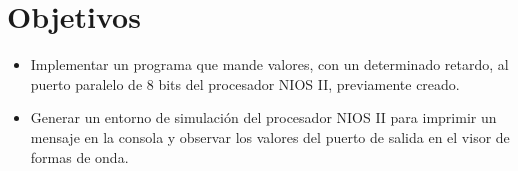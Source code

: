 \section{Objetivos \label{sec:obj}}


\begin{itemize} 
	\item Implementar un programa que mande valores, con un determinado retardo, al puerto paralelo de 8 bits del procesador NIOS II, previamente creado.
	\item Generar un entorno de simulación del procesador NIOS II para imprimir un mensaje en la consola y observar los valores del puerto de salida en el visor de formas de onda.
\end{itemize}